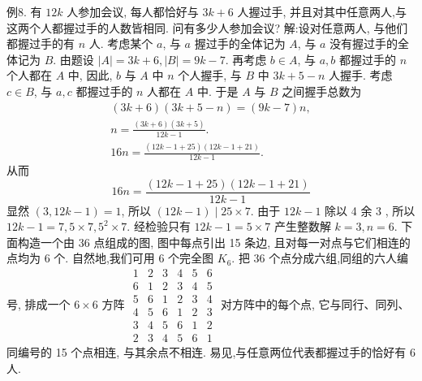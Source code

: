 例8. 有 $12 k$ 人参加会议, 每人都恰好与 $3 k+6$ 人握过手, 并且对其中任意两人,与这两个人都握过手的人数皆相同.
问有多少人参加会议?
解:设对任意两人, 与他们都握过手的有 $n$ 人.
考虑某个 $a$, 与 $a$ 握过手的全体记为 $A$, 与 $a$ 没有握过手的全体记为 $B$. 由题设 $|A|=3 k+6,|B|= 9 k-7$.
再考虑 $b \in A$, 与 $a, b$ 都握过手的 $n$ 个人都在 $A$ 中, 因此, $b$ 与 $A$ 中 $n$ 个人握手, 与 $B$ 中 $3 k+5-n$ 人握手.
考虑 $c \in B$, 与 $a, c$ 都握过手的 $n$ 人都在 $A$ 中.
于是 $A$ 与 $B$ 之间握手总数为
$$
\begin{gathered}
(3 k+6)(3 k+5-n)=(9 k-7) n, \\
n=\frac{(3 k+6)(3 k+5)}{12 k-1} . \\
16 n=\frac{(12 k-1+25)(12 k-1+21)}{12 k-1} .
\end{gathered}
$$
从而
$$
16 n=\frac{(12 k-1+25)(12 k-1+21)}{12 k-1}
$$
显然 $(3,12 k-1)=1$, 所以 $(12 k-1) \mid 25 \times 7$. 由于 $12 k-1$ 除以 4 余 3 , 所以 $12 k-1=7,5 \times 7,5^2 \times 7$. 经检验只有 $12 k-1=5 \times 7$ 产生整数解 $k=3, n=6$.
下面构造一个由 36 点组成的图, 图中每点引出 15 条边, 且对每一对点与它们相连的点均为 6 个.
自然地,我们可用 6 个完全图 $K_6$. 把 36 个点分成六组,同组的六人编号, 排成一个 $6 \times 6$ 方阵
$\begin{array}{llllll}1 & 2 & 3 & 4 & 5 & 6 \\ 6 & 1 & 2 & 3 & 4 & 5 \\ 5 & 6 & 1 & 2 & 3 & 4 \\ 4 & 5 & 6 & 1 & 2 & 3 \\ 3 & 4 & 5 & 6 & 1 & 2 \\ 2 & 3 & 4 & 5 & 6 & 1\end{array}$
对方阵中的每个点, 它与同行、同列、同编号的 15 个点相连, 与其余点不相连.
易见,与任意两位代表都握过手的恰好有 6 人.


